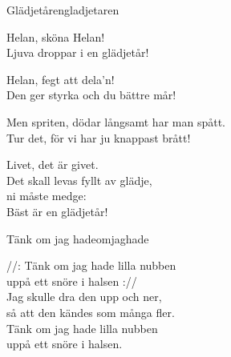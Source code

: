 \begin{song}{Glädjetåren}{gladjetaren}
\begin{vers}
Helan, sköna Helan!\\
Ljuva droppar i en glädjetår!\\
\end{vers}
\begin{vers}
Helan, fegt att dela'n!\\
Den ger styrka och du bättre mår!\\
\end{vers}
\begin{vers}
Men spriten, dödar långsamt har man spått.\\
Tur det, för vi har ju knappast brått!\\
\end{vers}
\begin{vers}
Livet, det är givet.\\
Det skall levas fyllt av glädje, \\
ni måste medge:\\
Bäst är en glädjetår!\\
\end{vers}
\end{song}

\begin{song}{Tänk om jag hade}{omjaghade}
\begin{vers}
//: Tänk om jag hade lilla nubben\\
uppå ett snöre i halsen ://\\
Jag skulle dra den upp och ner,\\
så att den kändes som många fler.\\
Tänk om jag hade lilla nubben\\
uppå ett snöre i halsen.\\
\end{vers}
\end{song}
\newpage

